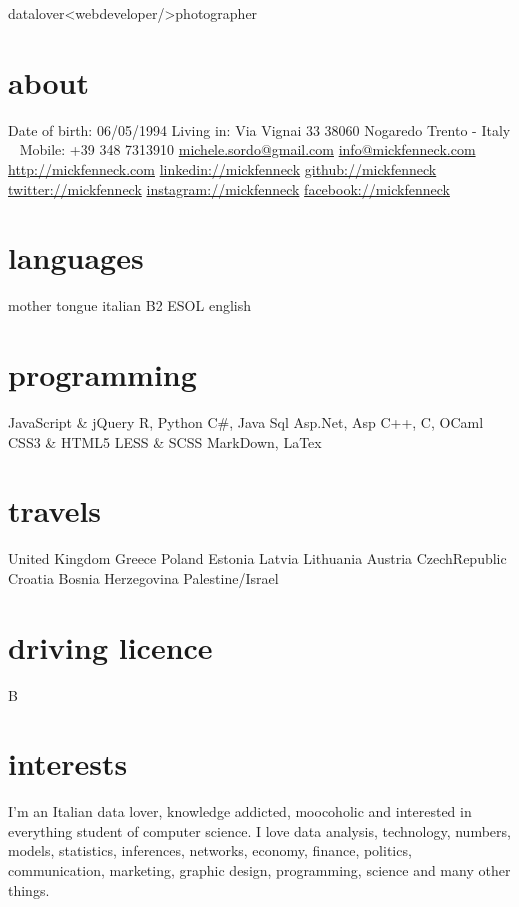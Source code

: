 \documentclass[]{friggeri-cv}
\begin{document}
       {datalover<webdeveloper/>photographer}


\begin{aside}
  \section{about}
    Date of birth:
    06/05/1994
    Living in:
    Via Vignai 33
    38060 Nogaredo
    Trento - Italy
    ~
    Mobile: +39 348 7313910
    \href{mailto:michele.sordo@gmail.com}{michele.sordo@gmail.com}
    \href{mailto:info@mickfenneck.com}{info@mickfenneck.com}
    \href{http://mickfenneck.com}{http://mickfenneck.com}
    \href{http://linkedin.com/in/mickfenneck}{linkedin://mickfenneck}
    \href{http://github.com/mickfenneck}{github://mickfenneck}
    \href{http://twitter.com/mickfenneck}{twitter://mickfenneck}
    \href{http://instagram.com/mickfenneck}{instagram://mickfenneck}
    \href{http://facebook.com/mickfenneck}{facebook://mickfenneck}
  \section{languages}
    mother tongue italian
    B2 ESOL english
  \section{programming}
    JavaScript \& jQuery
    R, Python
    C\#, Java
    Sql
    Asp.Net, Asp
    C++, C, OCaml
    CSS3 \& HTML5
    LESS \& SCSS
    MarkDown, LaTex
\section{travels}
    United Kingdom
    Greece
    Poland
    Estonia
    Latvia
    Lithuania
    Austria
    CzechRepublic
    Croatia
    Bosnia Herzegovina
    Palestine/Israel
\section{driving licence}
    B
\end{aside}






\section{interests}

I'm an Italian data lover, knowledge addicted, moocoholic and interested in everything student of computer science.
I love data analysis, technology, numbers, models, statistics, inferences, networks, economy, finance, politics, communication, marketing, graphic design, programming, science and many other things.
\end{document}
